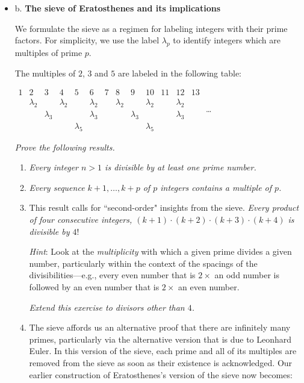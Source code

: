 \begin{itemize}
  \begin{itemize}
\item
b. {\bf The sieve of Eratosthenes and its implications}

We formulate the sieve as a regimen for labeling integers with their prime factors.  For simplicity, we use the label $\lambda_p$ to identify integers which are multiples of prime $p$.
\medskip

The multiples of $2$, $3$ and $5$ are labeled in the following table:

$\begin{array}{c|c|c|c|c|c|c|c|c|c|c|c|c}
1 & 2 & 3 & 4 & 5 & 6 & 7 & 8 & 9 & 10 & 11 & 12 & 13 \\
 & \lambda_2 & & \lambda_2 & & \lambda_2 & & \lambda_2 & & \lambda_2 & & \lambda_2 & \\
 & & \lambda_3 & &  & \lambda_3 & & & \lambda_3 & & & \lambda_3 & \\
 & & & & \lambda_5 & & & & & \lambda_5 & & & 
\end{array}$ \ldots

\bigskip

{\em Prove the following results.}
     \begin{enumerate}
     \item
{\em 
Every integer $n>1$ is divisible by at least one prime number.
}

     \medskip\item
{\em 
Every sequence $k+1, \ldots, k+p$ of $p$ integers contains a multiple of $p$.
}

      \medskip\item This result calls for ``second-order" insights from the sieve.
{\em 
Every product of four consecutive integers, $(k+1) \cdot (k+2) \cdot (k+3) \cdot (k+4)$ is divisible by $4!$
}

\smallskip

{\em Hint}:  Look at the {\em multiplicity} with which a given prime divides a given number, particularly within the context of the spacings of the divisibilities---e.g., every even number that is $2 \times$ an odd number is followed by an even number that is $2 \times$ an even number.  

\smallskip

{\em Extend this exercise to divisors other than $4$.}

\medskip\item
The sieve affords us an alternative proof that there are infinitely many primes, particularly via the alternative version that is due to Leonhard Euler.  In this version of the sieve, each prime and all of its multiples are removed from the sieve as soon as their existence is acknowledged.  Our earlier construction of Eratosthenes's version of the sieve now becomes:


\end{enumerate}
\end{itemize}
\end{itemize}
